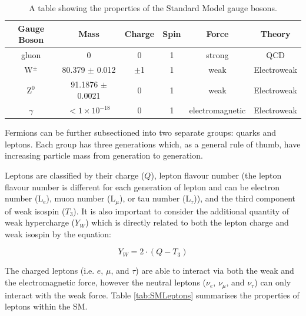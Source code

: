 \documentclass[12pt,a4paper,epsf,portrait,times,epsfig]{report}
\begin{document}
\begin{table}
	\begin{center}
		\begin{tabular}{ |c|c|c|c|c|c| }
			\hline \hline
			Gauge Boson & Mass & Charge & Spin & Force & Theory \\
			\hline
			gluon & 0 & 0 & 1 & strong & QCD \\
			\hline
			W$^{\pm}$ & 80.379 $\pm$ 0.012 & $\pm$1 & 1 & weak & Electroweak \\
			\hline
			Z$^{0}$ & 91.1876 $\pm$ 0.0021 & 0 & 1 & weak & Electroweak \\
			\hline
			$\gamma$ & $ < 1 \times 10^{-18}$ & 0 & 1 & electromagnetic & Electroweak \\
			\hline \hline
		\end{tabular}
		\caption{A table showing the properties of the Standard Model gauge bosons\cite{Article:PDG}.}
		\label{tab:SMBosons}
	\end{center}
\end{table}

Fermions can be further subsectioned into two separate groups: quarks and leptons. Each group has three generations which, as a general rule of thumb, have increasing particle mass from generation to generation. \par

Leptons are classified by their charge ($Q$), lepton flavour number (the lepton flavour number is different for each generation of lepton and can be electron number (L$_{e}$), muon number (L$_{\mu}$), or tau number (L$_{\tau}$)), and the third component of weak isospin ($T_{3}$). It is also important to consider the additional quantity of weak hypercharge ($Y_{W}$) which is directly related to both the lepton charge and weak isospin by the equation:

\begin{center}
	\begin{equation}
	Y_{W} = 2\cdot(Q-T_{3})
	\end{equation}
\end{center}

The charged leptons (i.e. $e$, $\mu$, and $\tau$) are able to interact via both the weak and the electromagnetic force, however the neutral leptons ($\nu_{e}$, $\nu_{\mu}$, and $\nu_{\tau}$) can only interact with the weak force. Table \ref{tab:SMLeptons} summarises the properties of leptons within the SM. 
\end{document}
